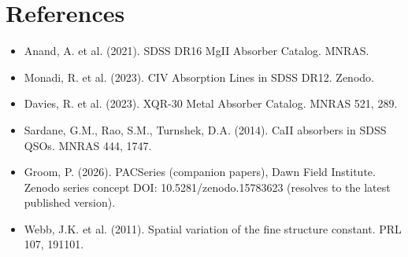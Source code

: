 \documentclass[11pt,a4paper]{article}
\providecommand{\tightlist}{\setlength{\itemsep}{0pt}\setlength{\parskip}{0pt}}
\begin{document}
\section*{References}

\begin{itemize}\tightlist
\item Anand, A. et al. (2021). SDSS DR16 MgII Absorber Catalog. MNRAS.
\item Monadi, R. et al. (2023). CIV Absorption Lines in SDSS DR12. Zenodo.
\item Davies, R. et al. (2023). XQR-30 Metal Absorber Catalog. MNRAS 521, 289.
\item Sardane, G.M., Rao, S.M., Turnshek, D.A. (2014). CaII absorbers in SDSS QSOs. MNRAS 444, 1747.
\item Groom, P. (2026). PACSeries (companion papers), Dawn Field Institute. Zenodo series concept DOI: 10.5281/zenodo.15783623 (resolves to the latest published version).
\item Webb, J.K. et al. (2011). Spatial variation of the fine structure constant. PRL 107, 191101.
\end{itemize}
\end{document}
